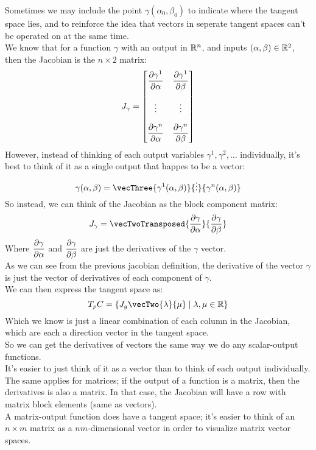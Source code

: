 \documentclass[12pt]{article}
\begin{document}
Sometimes we may include the point
$\gamma(\alpha_0, \beta_0)$ to indicate 
where the tangent space lies, and to reinforce
the idea that vectors in seperate tangent spaces
can't be operated on at the same time. \\

We know that for a function $\gamma$
with an output in $\mathbb{R}^n$,
and inputs $(\alpha, \beta) \in \mathbb{R}^2$,
then the Jacobian is the $n \times 2$ matrix:
\[ J_\gamma = \begin{bmatrix}
{\partialdd{\gamma^1}{\alpha}} & 
{\partialdd{\gamma^1}{\beta}} \vspace{10pt} \\
{\vdots} & {\vdots} \vspace{10pt} \\
{\partialdd{\gamma^n}{\alpha}} & 
{\partialdd{\gamma^n}{\beta}}
\end{bmatrix} \]
However, instead of thinking of each
output variables $\gamma^1, \gamma^2, \dots$
individually, it's best to think of it
as a single output that happes to be a vector:
\[ \gamma(\alpha, \beta) = 
\vecThree{\gamma^1(\alpha, \beta)}
{\vdots}{\gamma^n (\alpha, \beta)} \]
So instead, we can think of the Jacobian
as the block component matrix:
\[ J_\gamma = \vecTwoTransposed
{\partialdd{\gamma}{\alpha}}
{\partialdd{\gamma}{\beta}} \]
Where $\dfrac{\partial \gamma}{\partial \alpha}$
and $\dfrac{\partial \gamma}{\partial \beta}$
are just the derivatives of the $\gamma$ vector. \\
As we can see from the previous jacobian definition,
the derivative of the vector $\gamma$
is just the vector of derivatives of each component
of $\gamma$. \\

We can then express the tangent space as:
\[ T_pC = \curl{ 
J_g \vecTwo{\lambda}{\mu}
\mid \lambda, \mu \in \rbb } \]
Which we know is just a linear combination of each
column in the Jacobian, which are each
a direction vector in the tangent space. \\

So we can get the derivatives of vectors
the same way we do any scalar-output functions. \\
It's easier to just think of it as a vector
than to think of each output individually. \\

The same applies for matrices;
if the output of a function is a matrix,
then the derivatives is also a matrix. 
In that case, the Jacobian will have a row
with matrix block elements (same as vectors). \\
A matrix-output function does have a tangent space;
it's easier to think of an $n \times m$ matrix
as a $nm$-dimensional vector in order to visualize
matrix vector spaces. \\
\end{document}
